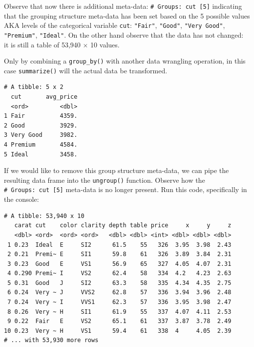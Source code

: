 \documentclass[12pt, krantz2,]{krantz}
\makeatletter
\newenvironment{Shaded}{\begin{snugshade}}{\end{snugshade}}
\newcommand{\DataTypeTok}[1]{\textcolor[rgb]{0.27,0.27,0.27}{#1}}
\newcommand{\KeywordTok}[1]{\textcolor[rgb]{0.27,0.27,0.27}{\textbf{#1}}}
\newcommand{\NormalTok}[1]{#1}
\newcommand{\OperatorTok}[1]{\textcolor[rgb]{0.43,0.43,0.43}{\textbf{#1}}}
\newcommand{\StringTok}[1]{\textcolor[rgb]{0.5,0.5,0.5}{#1}}
\newenvironment{kframe}{%
\medskip{}
\setlength{\fboxsep}{.8em}
 \def\at@end@of@kframe{}%
 \ifinner\ifhmode%
  \def\at@end@of@kframe{\end{minipage}}%
  \begin{minipage}{\columnwidth}%
 \fi\fi%
 \def\FrameCommand##1{\hskip\@totalleftmargin \hskip-\fboxsep
 \colorbox{shadecolor}{##1}\hskip-\fboxsep
     \hskip-\linewidth \hskip-\@totalleftmargin \hskip\columnwidth}%
 \MakeFramed {\advance\hsize-\width
   \@totalleftmargin\z@ \linewidth\hsize
   \@setminipage}}%
 {\par\unskip\endMakeFramed%
 \at@end@of@kframe}
\renewenvironment{Shaded}{\begin{kframe}}{\end{kframe}}
\makeatother
\begin{document}
Observe that now there is additional meta-data: \texttt{\#\ Groups:\ cut\ {[}5{]}} indicating that the grouping structure meta-data has been set based on the 5 possible values AKA levels of the categorical variable \texttt{cut}: \texttt{"Fair"}, \texttt{"Good"}, \texttt{"Very\ Good"}, \texttt{"Premium"}, \texttt{"Ideal"}. On the other hand observe that the data has not changed: it is still a table of 53,940 \(\times\) 10 values.

Only by combining a \texttt{group\_by()} with another data wrangling operation, in this case \texttt{summarize()} will the actual data be transformed.

\begin{Shaded}
\end{Shaded}

\begin{verbatim}
# A tibble: 5 x 2
  cut       avg_price
  <ord>         <dbl>
1 Fair          4359.
2 Good          3929.
3 Very Good     3982.
4 Premium       4584.
5 Ideal         3458.
\end{verbatim}

If we would like to remove this group structure meta-data, we can pipe the resulting data frame into the \texttt{ungroup()} function. Observe how the \texttt{\#\ Groups:\ cut\ {[}5{]}} meta-data is no longer present. Run this code, specifically in the console:

\begin{Shaded}
\end{Shaded}

\begin{verbatim}
# A tibble: 53,940 x 10
   carat cut    color clarity depth table price     x     y     z
   <dbl> <ord>  <ord> <ord>   <dbl> <dbl> <int> <dbl> <dbl> <dbl>
 1 0.23  Ideal  E     SI2      61.5    55   326  3.95  3.98  2.43
 2 0.21  Premi~ E     SI1      59.8    61   326  3.89  3.84  2.31
 3 0.23  Good   E     VS1      56.9    65   327  4.05  4.07  2.31
 4 0.290 Premi~ I     VS2      62.4    58   334  4.2   4.23  2.63
 5 0.31  Good   J     SI2      63.3    58   335  4.34  4.35  2.75
 6 0.24  Very ~ J     VVS2     62.8    57   336  3.94  3.96  2.48
 7 0.24  Very ~ I     VVS1     62.3    57   336  3.95  3.98  2.47
 8 0.26  Very ~ H     SI1      61.9    55   337  4.07  4.11  2.53
 9 0.22  Fair   E     VS2      65.1    61   337  3.87  3.78  2.49
10 0.23  Very ~ H     VS1      59.4    61   338  4     4.05  2.39
# ... with 53,930 more rows
\end{verbatim}
\end{document}
